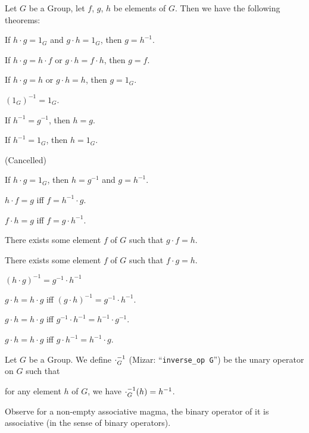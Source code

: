 \documentclass{article}
\begin{document}
Let $G$ be a Group, let $f$, $g$, $h$ be elements of $G$. Then we have
the following theorems:
\begin{thm}
\item\label{group1:5} If $h\cdot g=1_{G}$ and $g\cdot h=1_{G}$, then $g=h^{-1}$.
\item\label{group1:6} If $h\cdot g=h\cdot f$ or $g\cdot h=f\cdot h$,
  then $g=f$.
\item\label{group1:7} If $h\cdot g=h$ or $g\cdot h=h$, then $g=1_{G}$.
\item\label{group1:8} $(1_{G})^{-1}=1_{G}$. 
\item\label{group1:9} If $h^{-1}=g^{-1}$, then $h=g$.
\item\label{group1:10} If $h^{-1}=1_{G}$, then $h=1_{G}$.
\item\label{group1:11} (Cancelled)
\item\label{group1:12} If $h\cdot g=1_{G}$, then $h=g^{-1}$ and $g=h^{-1}$.
\item\label{group1:13} $h\cdot f=g$ iff $f=h^{-1}\cdot g$.
\item\label{group1:14} $f\cdot h=g$ iff $f=g\cdot h^{-1}$.
\item\label{group1:15} There exists some element $f$ of $G$ such that
  $g\cdot f=h$.
\item\label{group1:16} There exists some element $f$ of $G$ such that
  $f\cdot g=h$.
\item\label{group1:17} $(h\cdot g)^{-1}=g^{-1}\cdot h^{-1}$
\item\label{group1:18} $g\cdot h=h\cdot g$ iff $(g\cdot h)^{-1}=g^{-1}\cdot h^{-1}$.
\item\label{group1:19} $g\cdot h=h\cdot g$ iff $g^{-1}\cdot h^{-1}=h^{-1}\cdot g^{-1}$.
\item\label{group1:20} $g\cdot h=h\cdot g$ iff $g\cdot h^{-1}=h^{-1}\cdot g$.
\end{thm}

\begin{definition}
Let $G$ be a Group.
We define $\cdot_{G}^{-1}$ (Mizar: ``\verb#inverse_op G#'') be the unary operator on $G$ such that
\begin{defn}
\item for any element $h$ of $G$, we have $\cdot_{G}^{-1}(h)=h^{-1}$.
\end{defn}
\end{definition}

Observe for a non-empty associative magma, the binary operator of it is
associative (in the sense of binary operators).
\end{document}
